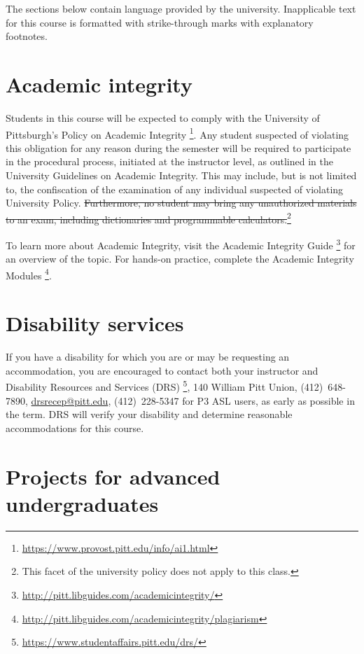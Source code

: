 \documentclass[12pt]{article}
\begin{document}
\begin{notebox}
  The sections below contain language provided by the university.
  Inapplicable text for this course is formatted with strike-through marks %
  with explanatory footnotes.
\end{notebox}

\section{Academic integrity}

Students in this course %
will be expected to comply with %
the University of Pittsburgh's %
Policy on Academic Integrity%
\footnote{\url{https://www.provost.pitt.edu/info/ai1.html}}.
%
Any student suspected of violating this obligation %
for any reason during the semester %
will be required to participate in the procedural process, %
initiated at the instructor level, %
as outlined in the University Guidelines on Academic Integrity.
%
This may include, %
but is not limited to, %
the confiscation of the examination %
of any individual suspected of violating University Policy.
%
\st{Furthermore, %
no student may bring any unauthorized materials to an exam, %
including dictionaries and programmable calculators.}\footnote{%
This facet of the university policy does not apply to this class.}

To learn more about Academic Integrity, %
visit the Academic Integrity Guide%
\footnote{\url{http://pitt.libguides.com/academicintegrity/}} %
for an overview of the topic.
%
For hands-on practice, %
complete the Academic Integrity Modules%
\footnote{\url{http://pitt.libguides.com/academicintegrity/plagiarism}}.

\section{Disability services}

If you have a disability %
for which you are or may be requesting an accommodation, %
you are encouraged to contact %
both your instructor and Disability Resources and Services (DRS)%
\footnote{\url{https://www.studentaffairs.pitt.edu/drs/}}, %
140 William Pitt Union, %
(412)~648-7890, %
\href{mailto:drsrecep@pitt.edu}{drsrecep@pitt.edu}, %
(412)~228-5347 for P3 ASL users, %
as early as possible in the term.
%
DRS will verify your disability %
and determine reasonable accommodations for this course.

\label{mylastpage}              %
\newpage
\appendix
\setcounter{page}{1}
\renewcommand{\thepage}{\arabic{page}}
\fancyhead[r]{Appendix Page \thepage{} of~\pageref*{mylastappendixpage}}

\section{Projects for advanced undergraduates}
\label{sec:projects}



\printbibliography[heading=none]{}%
\label{mylastappendixpage}
\end{document}
